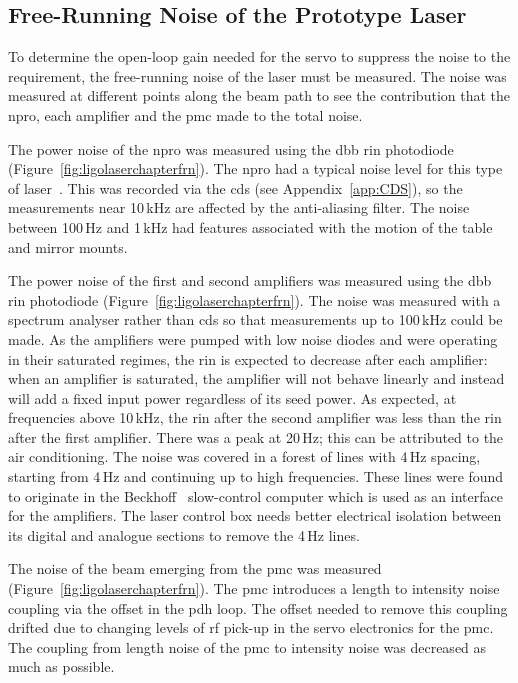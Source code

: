 \subsection{Free-Running Noise of the Prototype Laser}
To determine the open-loop gain needed for the servo to suppress the noise to the requirement, the free-running noise of the laser must be measured. The noise was measured at different points along the beam path to see the contribution that the \gls{npro}, each amplifier and the \gls{pmc} made to the total noise.
\par
The power noise of the \gls{npro} was measured using the \gls{dbb} \gls{rin} photodiode (Figure~\ref{fig:ligolaserchapterfrn}). The \gls{npro} had a typical noise level for this type of laser~\cite{Heurs2004}. This was recorded via the \gls{cds} (see Appendix~\ref{app:CDS}), so the measurements near 10\,\si{\kilo\hertz} are affected by the anti-aliasing filter. The noise between 100\,\si{\hertz} and 1\,\si{\kilo\hertz} had features associated with the motion of the table and mirror mounts.
\par
The power noise of the first and second amplifiers was measured using the \gls{dbb} \gls{rin} photodiode (Figure~\ref{fig:ligolaserchapterfrn}). The noise was measured with a spectrum analyser rather than \gls{cds} so that measurements up to 100\,kHz could be made. As the amplifiers were pumped with low noise diodes and were operating in their saturated regimes, the \gls{rin} is expected to decrease after each amplifier: when an amplifier is saturated, the amplifier will not behave linearly and instead will add a fixed input power regardless of its seed power. As expected, at frequencies above 10\,kHz, the \gls{rin} after the second amplifier was less than the \gls{rin} after the first amplifier.  There was a peak at 20\,\si{\hertz}; this can be attributed to the air conditioning. The noise was covered in a forest of lines with 4\,\si{\hertz} spacing, starting from  4\,\si{\hertz} and continuing up to high frequencies. These lines were found to originate in the Beckhoff~\cite{beckhoff} slow-control computer which is used as an interface for the amplifiers. The laser control box needs better electrical isolation between its digital and analogue sections to remove the 4\,Hz lines.
\par
The noise of the beam emerging from the \gls{pmc} was measured (Figure~\ref{fig:ligolaserchapterfrn}). The \gls{pmc} introduces a length to intensity noise coupling via the offset in the \gls{pdh} loop. The offset needed to remove this coupling drifted due to changing levels of \gls{rf} pick-up in the servo electronics for the \gls{pmc}. The coupling from length noise of the \gls{pmc} to intensity noise was decreased as much as possible.
